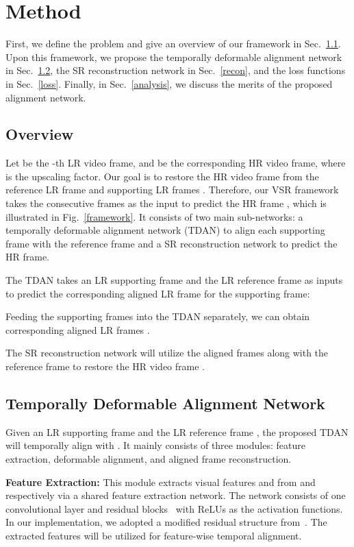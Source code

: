 \documentclass[10pt,twocolumn,letterpaper]{article}
\begin{document}
\section{Method}

First, we define the problem and give an overview of our framework in Sec.~\ref{overview}. Upon this framework, we propose the temporally deformable alignment network in Sec.~\ref{TDAN}, the SR reconstruction network in Sec.~\ref{recon}, and the loss functions in Sec.~\ref{loss}. Finally, in Sec.~\ref{analysis}, we discuss the merits of the proposed alignment network.

\subsection{Overview}
\label{overview}

Let  be the -th LR video frame, and  be the corresponding HR video frame, where  is the upscaling factor. Our goal is to restore the HR video frame  from the reference LR frame  and  supporting LR frames . Therefore, our VSR framework takes the consecutive  frames  as the input to predict the HR frame , which is illustrated in Fig.~\ref{framework}. It consists of two main sub-networks: a temporally deformable alignment network (TDAN) to align each supporting frame with the reference frame and a SR reconstruction network to predict the HR frame.

The TDAN takes an LR supporting frame  and the LR reference frame  as inputs to predict the corresponding aligned LR frame  for the supporting frame:

Feeding the  supporting frames into the TDAN separately, we can obtain  corresponding aligned LR frames .

The SR reconstruction network will utilize the  aligned frames along with the reference frame to restore the HR video frame .

\subsection{Temporally Deformable Alignment Network}
\label{TDAN}
Given an LR supporting frame  and the LR reference frame , the proposed TDAN will temporally align  with . It mainly consists of three modules: feature extraction, deformable alignment, and aligned frame reconstruction.

\noindent \textbf{Feature Extraction:} This module extracts visual features  and  from  and  respectively via a shared feature extraction network. The network consists of one convolutional layer and  residual blocks~\cite{he2016deep} with ReLUs as the activation functions. In our implementation, we adopted a modified residual structure from~\cite{lim2017enhanced}. The extracted features will be utilized for feature-wise temporal alignment.
\end{document}
